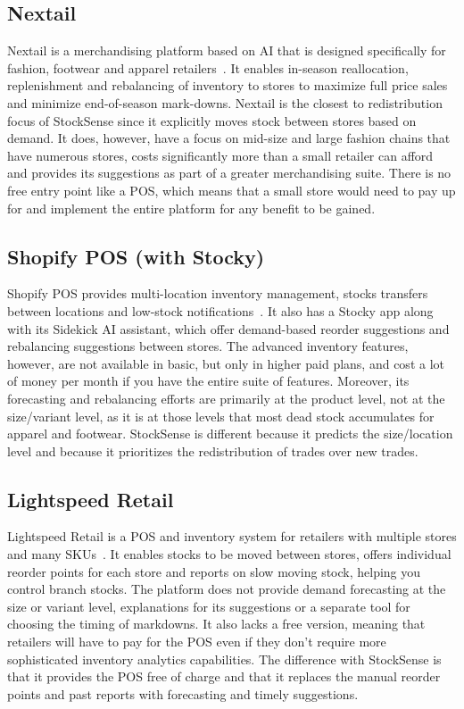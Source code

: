 \documentclass{StockSense}
\begin{document}
\subsection{Nextail}

Nextail is a merchandising platform based on AI that is designed specifically for fashion, footwear and apparel retailers~\cite{nextail}. It enables in-season reallocation, replenishment and rebalancing of inventory to stores to maximize full price sales and minimize end-of-season mark-downs. Nextail is the closest to redistribution focus of StockSense since it explicitly moves stock between stores based on demand. It does, however, have a focus on mid-size and large fashion chains that have numerous stores, costs significantly more than a small retailer can afford and provides its suggestions as part of a greater merchandising suite. There is no free entry point like a POS, which means that a small store would need to pay up for and implement the entire platform for any benefit to be gained.

\subsection{Shopify POS (with Stocky)}

Shopify POS provides multi-location inventory management, stocks transfers between locations and low-stock notifications~\cite{shopifypos}. It also has a Stocky app along with its Sidekick AI assistant, which offer demand-based reorder suggestions and rebalancing suggestions between stores. The advanced inventory features, however, are not available in basic, but only in higher paid plans, and cost a lot of money per month if you have the entire suite of features. Moreover, its forecasting and rebalancing efforts are primarily at the product level, not at the size/variant level, as it is at those levels that most dead stock accumulates for apparel and footwear. StockSense is different because it predicts the size/location level and because it prioritizes the redistribution of trades over new trades.

\subsection{Lightspeed Retail}

Lightspeed Retail is a POS and inventory system for retailers with multiple stores and many SKUs~\cite{lightspeed}. It enables stocks to be moved between stores, offers individual reorder points for each store and reports on slow moving stock, helping you control branch stocks. The platform does not provide demand forecasting at the size or variant level, explanations for its suggestions or a separate tool for choosing the timing of markdowns. It also lacks a free version, meaning that retailers will have to pay for the POS even if they don't require more sophisticated inventory analytics capabilities. The difference with StockSense is that it provides the POS free of charge and that it replaces the manual reorder points and past reports with forecasting and timely suggestions.
\end{document}
